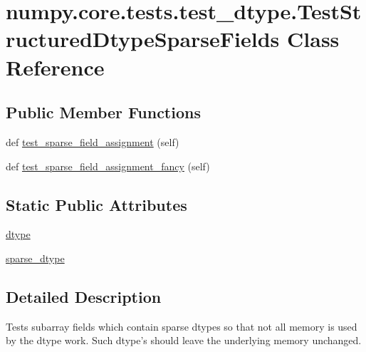 \hypertarget{classnumpy_1_1core_1_1tests_1_1test__dtype_1_1TestStructuredDtypeSparseFields}{}\section{numpy.\+core.\+tests.\+test\+\_\+dtype.\+Test\+Structured\+Dtype\+Sparse\+Fields Class Reference}
\label{classnumpy_1_1core_1_1tests_1_1test__dtype_1_1TestStructuredDtypeSparseFields}
\subsection*{Public Member Functions}
\begin{DoxyCompactItemize}
\item 
def \hyperlink{classnumpy_1_1core_1_1tests_1_1test__dtype_1_1TestStructuredDtypeSparseFields_abcb32057cbb19335637e0d1ee5fc7436}{test\+\_\+sparse\+\_\+field\+\_\+assignment} (self)
\item 
def \hyperlink{classnumpy_1_1core_1_1tests_1_1test__dtype_1_1TestStructuredDtypeSparseFields_a8ec4f51da7688132ef47e7a64f4a5d91}{test\+\_\+sparse\+\_\+field\+\_\+assignment\+\_\+fancy} (self)
\end{DoxyCompactItemize}
\subsection*{Static Public Attributes}
\begin{DoxyCompactItemize}
\item 
\hyperlink{classnumpy_1_1core_1_1tests_1_1test__dtype_1_1TestStructuredDtypeSparseFields_a97197bdaf96f529c9c7b31d8cb9e3cfa}{dtype}
\item 
\hyperlink{classnumpy_1_1core_1_1tests_1_1test__dtype_1_1TestStructuredDtypeSparseFields_aecb7e0689231476aa329642facb96d72}{sparse\+\_\+dtype}
\end{DoxyCompactItemize}


\subsection{Detailed Description}
\begin{DoxyVerb}Tests subarray fields which contain sparse dtypes so that
not all memory is used by the dtype work. Such dtype's should
leave the underlying memory unchanged.
\end{DoxyVerb}
 

